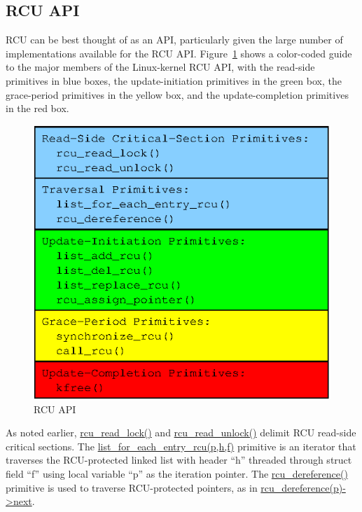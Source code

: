 \subsection{RCU API}
\label{sec:advsync:RCU API}

RCU can be best thought of as an API, particularly given the large number
of implementations available for the RCU API.
Figure~\ref{fig:advsync:RCU API}
shows a color-coded guide to the major members of the Linux-kernel
RCU API, with the read-side primitives in blue boxes, the update-initiation
primitives in the green box, the grace-period primitives in the yellow box,
and the update-completion primitives in the red box.

\begin{figure}[htb]
\begin{center}
\includegraphics{advsync/RCU-API}
\end{center}
\caption{RCU API}
\label{fig:advsync:RCU API}
\end{figure}

As noted earlier, \url{rcu_read_lock()} and \url{rcu_read_unlock()}
delimit RCU read-side critical sections.
The \url{list_for_each_entry_rcu(p,h,f)} primitive is an iterator that
traverses the RCU-protected linked list with header ``h'' threaded
through struct field ``f'' using
local variable ``p'' as the iteration pointer.
The \url{rcu_dereference()} primitive is used to traverse RCU-protected
pointers, as in \url{rcu_dereference(p)->next}.

